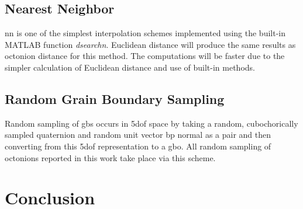 \documentclass[preprint,12pt]{elsarticle}
\begin{document}
\subsection{Nearest Neighbor} \label{sec:methods:nn}

\Gls{nn} is one of the simplest interpolation schemes implemented using the built-in MATLAB function \textit{dsearchn}. Euclidean distance will produce the same results as octonion distance for this method. The computations will be faster due to the simpler calculation of Euclidean distance and use of built-in methods.

\subsection{Random Grain Boundary Sampling} \label{sec:methods:rand}

Random sampling of \glspl{gb} occurs in \gls{5dof} space by taking a random, cubochorically sampled quaternion and random unit vector \gls{bp} normal as a pair and then converting from this \gls{5dof} representation to a \gls{gbo}. All random sampling of octonions reported in this work take place via this scheme.

    
        
    


\section{Conclusion} \label{sec:conclusion}
\end{document}
